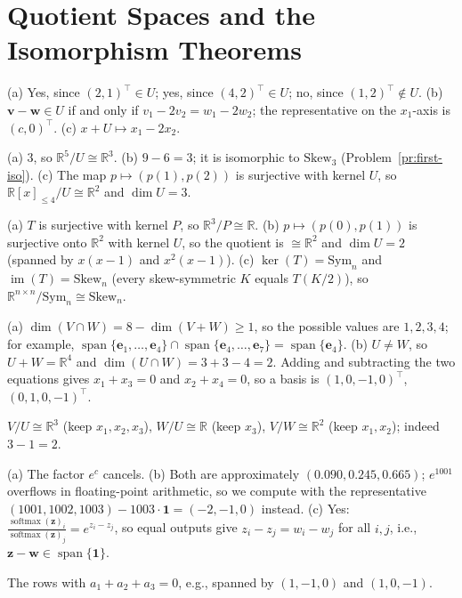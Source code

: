 \documentclass[11pt]{article}
\DeclareMathOperator{\im}{im}
\DeclareMathOperator{\Span}{span}
\begin{document}
\section*{Quotient Spaces and the Isomorphism Theorems}

\begin{description}[leftmargin=0pt, itemsep=0.3em]
    \item[\ref{pr:cosets}.] (a) Yes, since $(2, 1)^\top \in U$; yes, since $(4, 2)^\top \in U$; no, since $(1, 2)^\top \notin U$. (b) $\mathbf{v} - \mathbf{w} \in U$ if and only if $v_1 - 2v_2 = w_1 - 2w_2$; the representative on the $x_1$-axis is $(c, 0)^\top$. (c) $x + U \mapsto x_1 - 2x_2$.
    \item[\ref{pr:quotient-dim}.] (a) $3$, so $\mathbb{R}^5/U \cong \mathbb{R}^3$. (b) $9 - 6 = 3$; it is isomorphic to $\mathrm{Skew}_3$ (Problem~\ref{pr:first-iso}). (c) The map $p \mapsto (p(1), p(2))$ is surjective with kernel $U$, so $\mathbb{R}[x]_{\leq 4}/U \cong \mathbb{R}^2$ and $\dim U = 3$.
    \item[\ref{pr:first-iso}.] (a) $T$ is surjective with kernel $P$, so $\mathbb{R}^3/P \cong \mathbb{R}$. (b) $p \mapsto (p(0), p(1))$ is surjective onto $\mathbb{R}^2$ with kernel $U$, so the quotient is $\cong \mathbb{R}^2$ and $\dim U = 2$ (spanned by $x(x - 1)$ and $x^2(x - 1)$). (c) $\ker(T) = \mathrm{Sym}_n$ and $\im(T) = \mathrm{Skew}_n$ (every skew-symmetric $K$ equals $T(K/2)$), so $\mathbb{R}^{n \times n}/\mathrm{Sym}_n \cong \mathrm{Skew}_n$.
    \item[\ref{pr:grassmann}.] (a) $\dim(V \cap W) = 8 - \dim(V + W) \geq 1$, so the possible values are $1, 2, 3, 4$; for example, $\Span\{\mathbf{e}_1, \ldots, \mathbf{e}_4\} \cap \Span\{\mathbf{e}_4, \ldots, \mathbf{e}_7\} = \Span\{\mathbf{e}_4\}$. (b) $U \neq W$, so $U + W = \mathbb{R}^4$ and $\dim(U \cap W) = 3 + 3 - 4 = 2$. Adding and subtracting the two equations gives $x_1 + x_3 = 0$ and $x_2 + x_4 = 0$, so a basis is $(1, 0, -1, 0)^\top$, $(0, 1, 0, -1)^\top$.
    \item[\ref{pr:third-iso}.] $V/U \cong \mathbb{R}^3$ (keep $x_1, x_2, x_3$), $W/U \cong \mathbb{R}$ (keep $x_3$), $V/W \cong \mathbb{R}^2$ (keep $x_1, x_2$); indeed $3 - 1 = 2$.
    \item[\ref{pr:softmax}.] (a) The factor $e^c$ cancels. (b) Both are approximately $(0.090, 0.245, 0.665)$; $e^{1001}$ overflows in floating-point arithmetic, so we compute with the representative $(1001, 1002, 1003) - 1003\cdot\mathbf{1} = (-2, -1, 0)$ instead. (c) Yes: $\frac{\operatorname{softmax}(\mathbf{z})_i}{\operatorname{softmax}(\mathbf{z})_j} = e^{z_i - z_j}$, so equal outputs give $z_i - z_j = w_i - w_j$ for all $i, j$, i.e., $\mathbf{z} - \mathbf{w} \in \Span\{\mathbf{1}\}$.
    \item[\ref{pr:quotient-dual}.] The rows with $a_1 + a_2 + a_3 = 0$, e.g., spanned by $(1, -1, 0)$ and $(1, 0, -1)$.
\end{description}
\end{document}
